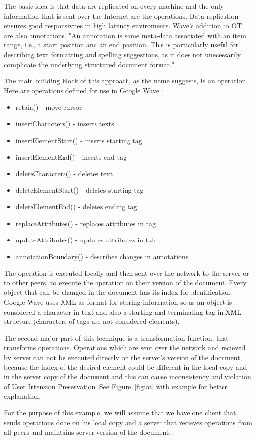 \documentclass[12pt,oneside]{fithesis2}
\begin{document}
\par The basic idea is that data are replicated on every machine and the only information that is sent over the Internet are the operations. Data replication ensures good responsivnes in high latency enviroments. Wave's addition to OT are also annotations. "An annotation is some meta-data associated with an item range, i.e., a start position and an end position. This is particularly useful for describing text formatting and spelling suggestions, as it does not unecessarily complicate the underlying structured document format." \cite{Google} \par The main building block of this approach, as the name suggests, is an operation. Here are operations defined for use in Google Wave \cite{Google}:
\begin{itemize}
\item retain() - move cursor
\item insertCharacters() - inserts texts
\item insertElementStart() - inserts starting tag
\item insertElementEnd() - inserts end tag
\item deleteCharacters() - deletes text
\item deleteElementStart() - deletes starting tag
\item deleteElementEnd() - deletes ending tag
\item replaceAttributes() - replaces attributes in tag
\item updateAttributes() - updates attributes in tah
\item annotationBoundary() - describes changes in annotations
\end{itemize}
\par The operation is executed locally and then sent over the network to the server or to other peers, to execute the operation on their version of the document. Every object that can be changed in the document has its index for identification. Google Wave uses XML as format for storing information so as an object is considered a character in text and also a starting and terminating tag in XML structure (characters of tags are not considered elements). 
\par The second major part of this technique is a transformation function, that transforms operations. Operations which are sent over the network and recieved by server can not be executed directly on the server's version of the document, because the index of the desired element could be different in the local copy and in the server copy of the document and this can cause inconsistency and violation of User Intension Preservation. See Figure~\ref{fig:ot} with example for better explanation. \par For the purpose of this example, we will assume that we have one client that sends operations done on his local copy and a server that recieves operations from all peers and maintains server version of the document. 
\end{document}
